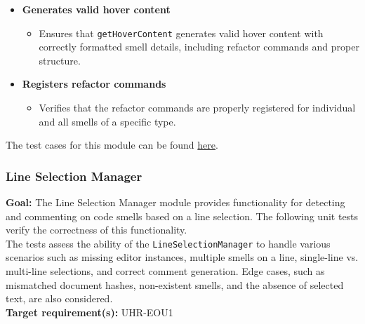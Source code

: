 \documentclass[12pt, titlepage]{article}
\begin{document}
\begin{itemize}
    \item \textbf{Generates valid hover content}
    \begin{itemize}
        \item Ensures that \texttt{getHoverContent} generates valid hover content with correctly formatted smell details, including refactor commands and proper structure.
    \end{itemize}

    \item \textbf{Registers refactor commands}
    \begin{itemize}
        \item Verifies that the refactor commands are properly registered for individual and all smells of a specific type.
    \end{itemize}
\end{itemize}

\noindent The test cases for this module can be found \href{https://github.com/ssm-lab/capstone--sco-vs-code-plugin/blob/plugin-multi-file/test/ui/hoverManager.test.ts}{here}.

\subsubsection{Line Selection Manager}

\textbf{Goal:} The Line Selection Manager module provides functionality for detecting and commenting on code smells based on a line selection. The following unit tests verify the correctness of this functionality.\\

\noindent The tests assess the ability of the \texttt{LineSelectionManager} to handle various scenarios such as missing editor instances, multiple smells on a line, single-line vs. multi-line selections, and correct comment generation. Edge cases, such as mismatched document hashes, non-existent smells, and the absence of selected text, are also considered.\\

\noindent \textbf{Target requirement(s):} UHR-EOU1~\cite{SRS} \\
\end{document}
